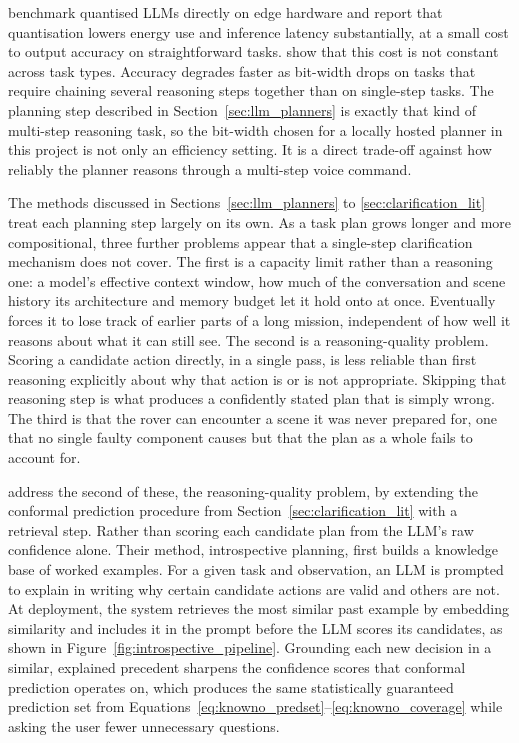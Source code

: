 \citet{husom2025edgellm} benchmark quantised LLMs directly on 
edge hardware and report that quantisation lowers energy use and inference 
latency substantially, at a small cost to output accuracy on straightforward tasks. \citet{liu2025quantreasoning} show 
that this cost is not constant across task types. Accuracy degrades faster as bit-width drops on tasks that require 
chaining several reasoning steps together than on single-step tasks. The planning step described in Section~\ref{sec:llm_planners} 
is exactly that kind of multi-step reasoning task, so the bit-width chosen for a locally hosted planner in this project is not only an 
efficiency setting. It is a direct trade-off against how reliably the planner reasons through a multi-step voice command.

\label{sec:hallucination_lit}

The methods discussed in Sections~\ref{sec:llm_planners} to \ref{sec:clarification_lit} treat each
planning step largely on its own. As a task plan grows longer and more compositional, three
further problems appear that a single-step clarification mechanism does not cover. The first is a
capacity limit rather than a reasoning one: a model's effective context window, how much of the
conversation and scene history its architecture and memory budget let it hold onto at once.
Eventually forces it to lose track of earlier parts of a long mission, independent of how well it
reasons about what it can still see. The second is a reasoning-quality problem. Scoring a
candidate action directly, in a single pass, is less reliable than first reasoning explicitly
about why that action is or is not appropriate. Skipping that reasoning step is what produces
a confidently stated plan that is simply wrong. The third is that the rover can encounter a scene
it was never prepared for, one that no single faulty component causes but that the plan as a whole
fails to account for.

\citet{liang2024introspective} address the second of these, the reasoning-quality problem, by
extending the conformal prediction procedure from Section~\ref{sec:clarification_lit} with a
retrieval step. Rather than scoring each candidate plan from the LLM's raw confidence alone. 
Their method, introspective planning, 
first builds a knowledge base of worked examples. For a given task and observation, an LLM is prompted to explain in writing why certain candidate actions are 
valid and others are not. At deployment, the system retrieves the most similar past example by embedding similarity and includes it in the prompt before the LLM scores its candidates, 
as shown in Figure~\ref{fig:introspective_pipeline}. Grounding each new decision in a similar, explained precedent sharpens the confidence scores that conformal prediction operates on,
which produces the same statistically guaranteed prediction set from Equations~\ref{eq:knowno_predset}--\ref{eq:knowno_coverage} while asking the user fewer unnecessary questions.

